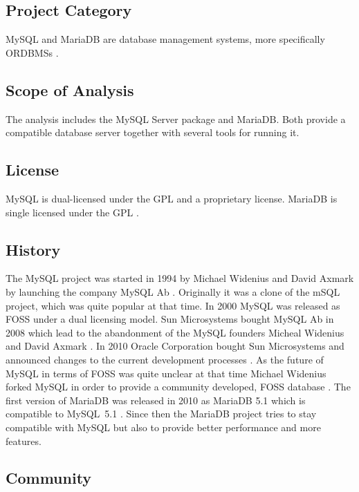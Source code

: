 \subsection{Project Category}

MySQL and MariaDB are database management systems, more specifically
\acp{ORDBMS} \cite{MySQLAbout}.

\subsection{Scope of Analysis}

The analysis includes the MySQL Server package and MariaDB. Both provide a
compatible database server together with several tools for running it.

\subsection{License}

MySQL is dual-licensed under the \ac{GPL} and a proprietary license. MariaDB is
single licensed under the \ac{GPL} \cite{MySQLLicense}.

\subsection{History}

The MySQL project was started in 1994 by Michael Widenius and David Axmark by
launching the company MySQL Ab \cite{MySQLHistory}. Originally it was a clone
of the mSQL project, which was quite popular at that time. In 2000 MySQL was
released as \ac{FOSS} under a dual licensing model. Sun Microsystems bought
MySQL Ab in 2008 which lead to the abandonment of the MySQL founders Micheal
Widenius and David Axmark \cite{MySQLSun}. In 2010 Oracle Corporation bought
Sun Microsystems and announced changes to the current development processes
\cite{MySQLOracle}. As the future of MySQL in terms of \ac{FOSS} was quite
unclear at that time Michael Widenius forked MySQL in order to provide a
community developed, \ac{FOSS} database \cite{MySQLBehind}. The first version
of MariaDB was released in 2010 as MariaDB 5.1 which is compatible to MySQL~5.1
\cite{MySQLMariaDB5.1}. Since then the MariaDB project tries to stay compatible
with MySQL but also to provide better performance and more features.

\subsection{Community}

